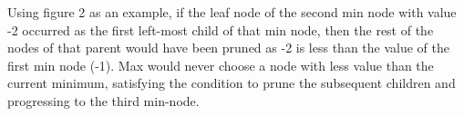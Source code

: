 \documentclass{article}
\begin{document}
Using figure 2 as an example, if the leaf node of the second min node with value -2 occurred as the first left-most child of that min node, then the rest of the nodes of that parent would have been pruned as -2 is less than the value of the first min node (-1). Max would never choose a node with less value than the current minimum, satisfying the condition to prune the subsequent children and progressing to the third min-node.
\end{document}
